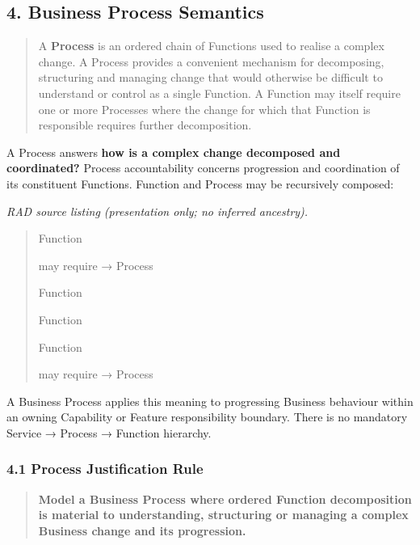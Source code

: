 \label{rad:metamodel:181}

\par\smallskip
{}\label{rad:metamodel:183}
\subsection*{4. Business Process Semantics}
\label{rad:metamodel:185}

\begin{quote}

A \textbf{Process} is an ordered chain of Functions used to realise a complex change. A Process provides a convenient mechanism for decomposing, structuring and managing change that would otherwise be difficult to understand or control as a single Function. A Function may itself require one or more Processes where the change for which that Function is responsible requires further decomposition.


\end{quote}
\label{rad:metamodel:191}

A Process answers \textbf{how is a complex change decomposed and coordinated?} Process accountability concerns progression and coordination of its constituent Functions. Function and Process may be recursively composed:

\label{rad:metamodel:195}

\textit{RAD source listing (presentation only; no inferred ancestry).}
\begin{quote}
Function

may require → Process

Function

Function

Function

may require → Process
\end{quote}
\label{rad:metamodel:204}

A Business Process applies this meaning to progressing Business behaviour within an owning Capability or Feature responsibility boundary. There is no mandatory Service → Process → Function hierarchy.

\label{rad:metamodel:208}
\subsubsection*{4.1 Process Justification Rule}
\label{rad:metamodel:209}

\begin{quote}

\textbf{Model a Business Process where ordered Function decomposition is material to understanding, structuring or managing a complex Business change and its progression.}


\end{quote}
\label{rad:metamodel:213}

